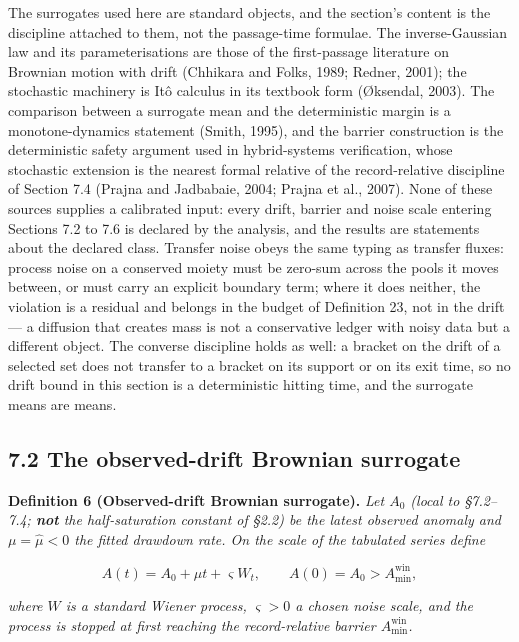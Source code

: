 \documentclass[11pt]{article}
\begin{document}
The surrogates used here are standard objects, and the section's content is the discipline attached to them, not the passage-time formulae. The inverse-Gaussian law and its parameterisations are those of the first-passage literature on Brownian motion with drift (Chhikara and Folks, 1989; Redner, 2001); the stochastic machinery is It\^{o} calculus in its textbook form (\O{}ksendal, 2003). The comparison between a surrogate mean and the deterministic margin is a monotone-dynamics statement (Smith, 1995), and the barrier construction is the deterministic safety argument used in hybrid-systems verification, whose stochastic extension is the nearest formal relative of the record-relative discipline of Section 7.4 (Prajna and Jadbabaie, 2004; Prajna et al., 2007). None of these sources supplies a calibrated input: every drift, barrier and noise scale entering Sections 7.2 to 7.6 is declared by the analysis, and the results are statements about the declared class. Transfer noise obeys the same typing as transfer fluxes: process noise on a conserved moiety must be zero-sum across the pools it moves between, or must carry an explicit boundary term; where it does neither, the violation is a residual and belongs in the budget of Definition 23, not in the drift --- a diffusion that creates mass is not a conservative ledger with noisy data but a different object. The converse discipline holds as well: a bracket on the drift of a selected set does not transfer to a bracket on its support or on its exit time, so no drift bound in this section is a deterministic hitting time, and the surrogate means are means.

\subsection*{7.2 The observed-drift Brownian surrogate}\label{72-the-observed-drift-brownian-surrogate}

\textbf{Definition 6 (Observed-drift Brownian surrogate).} \emph{Let \(A_0\) (local to \S7.2--7.4; \textbf{not} the half-saturation constant of \S2.2) be the latest observed anomaly and \(\mu=\hat\mu<0\) the fitted drawdown rate. On the scale of the tabulated series define} 

$$A(t) = A_0 + \mu t + \varsigma W_t, \qquad A(0) = A_0 > A_{\min}^{\mathrm{win}},$$

 \emph{where \(W\) is a standard Wiener process, \(\varsigma > 0\) a chosen noise scale, and the process is stopped at first reaching the record-relative barrier \(A_{\min}^{\mathrm{win}}\).}
\end{document}
